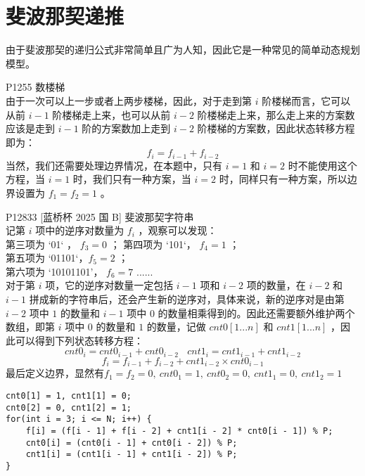 \documentclass{beamer}
\begin{document}
\section{斐波那契递推}
\begin{frame}
由于斐波那契的递归公式非常简单且广为人知，因此它是一种常见的简单动态规划模型。
\end{frame}
\begin{frame}
P1255 数楼梯\\ 
由于一次可以上一步或者上两步楼梯，因此，对于走到第 $i$ 阶楼梯而言，它可以从前 $i - 1$ 阶楼梯走上来，也可以从前 $i - 2$ 阶楼梯走上来，那么走上来的方案数应该是走到 $i - 1$ 阶的方案数加上走到 $i - 2$ 阶楼梯的方案数，因此状态转移方程即为：
$$f_i = f_{i - 1} + f_{i - 2}$$
当然，我们还需要处理边界情况，在本题中，只有 $i = 1$ 和 $i = 2$ 时不能使用这个方程，当 $i = 1$ 时，我们只有一种方案，当 $i = 2$ 时，同样只有一种方案，所以边界设置为 $f_1 = f_2 = 1$ 。
\end{frame}
\begin{frame}
P12833 [蓝桥杯 2025 国 B] 斐波那契字符串\\ 
记第 $i$ 项中的逆序对数量为 $f_i$ ，观察可以发现：\\
第三项为 	`01` ， $f_3 = 0$ ；
第四项为 `101`， $f_4 = 1$ ；  \\ 
第五项为 `01101`，$f_5 = 2$ ； \\
第六项为 `10101101'， $f_6 = 7$ ...... \\ 
对于第 $i$ 项，它的逆序对数量一定包括 $i - 1$ 项和 $i - 2$ 项的数量，在 $i - 2$ 和 $i - 1$ 拼成新的字符串后，还会产生新的逆序对，具体来说，新的逆序对是由第 $i - 2$ 项中 $1$ 的数量和 $i - 1$ 项中 $0$ 的数量相乘得到的。因此还需要额外维护两个数组，即第 $i$ 项中 $0$ 的数量和 $1$ 的数量，记做 $cnt0[1...n]$ 和 $cnt1[1...n]$ ，因此可以得到下列状态转移方程：
$$cnt0_i = cnt0_{i - 1} + cnt0_{i - 2} \ \ \ \ cnt1_i = cnt1_{i - 1} + cnt1_{i - 2}$$
$$f_i = f_{i - 1} + f_{i - 2} + cnt1_{i - 2} \times cnt0_{i - 1}$$
最后定义边界，显然有$f_1 = f_2 = 0, \ cnt0_1 = 1, \ cnt0_2 = 0, \ cnt1_1 = 0, \ cnt1_2 = 1$
\end{frame}
\begin{frame}[fragile]
\begin{onlyenv}
\begin{verbatim}
cnt0[1] = 1, cnt1[1] = 0;
cnt0[2] = 0, cnt1[2] = 1;
for(int i = 3; i <= N; i++) {
    f[i] = (f[i - 1] + f[i - 2] + cnt1[i - 2] * cnt0[i - 1]) % P;
    cnt0[i] = (cnt0[i - 1] + cnt0[i - 2]) % P;
    cnt1[i] = (cnt1[i - 1] + cnt1[i - 2]) % P;
}
\end{verbatim}
\end{onlyenv}
\end{frame}
\end{document}
